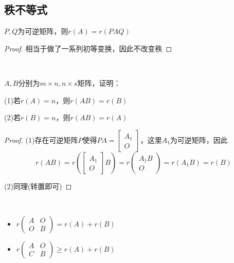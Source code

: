 \subsection{秩不等式}

\begin{lemma}[乘可逆矩阵不改变秩]
  $P,Q$为可逆矩阵，则$r(A) = r(PAQ)$
\end{lemma}

\begin{proof}
  相当于做了一系列初等变换，因此不改变秩
\end{proof}

~

\begin{exercise}[非方阵情况]
  $A,B$分别为$m \times n, n \times s$矩阵，证明：

  (1)若$r(A) = n$，则$r(AB) = r(B)$

  (2)若$r(B) = n$，则$r(AB) = r(A)$
\end{exercise}

\begin{proof}
  (1)存在可逆矩阵$P$使得$PA = \left[
    \begin{array}{c}
      A_1\\
      O
    \end{array}
  \right]$，这里$A_1$为可逆矩阵，因此
  \begin{equation*}
    r(AB) = r(\left[
      \begin{array}{c}
        A_1\\
        O
      \end{array}
    \right]B) = r \left(
      \begin{array}{c}
        A_1B\\
        O
      \end{array}
    \right) = r(A_1B) = r(B)
  \end{equation*}

  (2)同理(转置即可)
\end{proof}

~

\begin{lemma}[分块矩阵的秩]
  \begin{itemize}
  \item $r \left(
      \begin{array}{cc}
        A&O\\
        O&B
      \end{array}
    \right) = r(A) + r(B)$
  \item $r \left(
      \begin{array}{cc}
        A&O\\
        C&B
      \end{array}
    \right) \geq r(A) + r(B)$
  \end{itemize}
\end{lemma}

